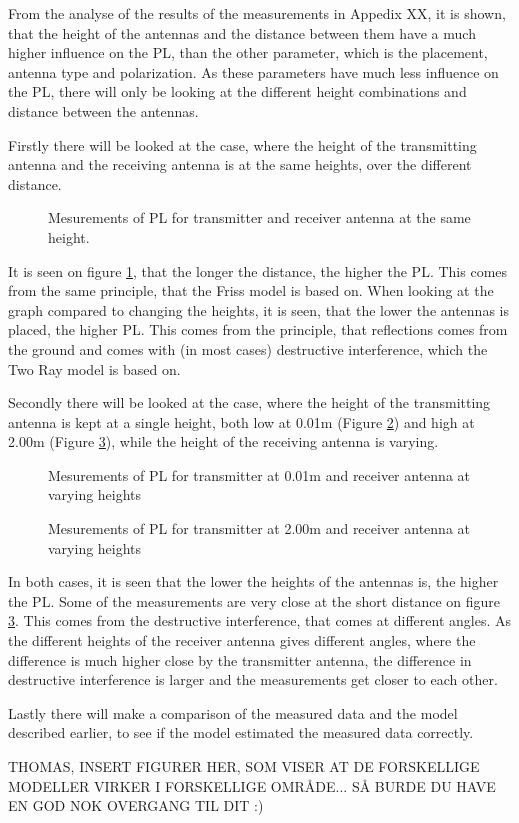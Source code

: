 From the analyse of the results of the measurements in Appedix XX, it is shown, that the height of the antennas and the distance between them have a much higher influence on the PL, than the other parameter, which is the placement, antenna type and polarization. As these parameters have much less influence on the PL, there will only be looking at the different height combinations and distance between the antennas.

Firstly there will be looked at the case, where the height of the transmitting antenna and the receiving antenna is at the same heights, over the different distance.

\begin{figure}[!htbp]
\centering

\caption{Mesurements of PL for transmitter and receiver antenna at the same height.}
\label{Meas1}
\end{figure}

It is seen on figure \ref{Meas1}, that the longer the distance, the higher the PL. This comes from the same principle, that the Friss model is based on. When looking at the graph compared to changing the heights, it is seen, that the lower the antennas is placed, the higher PL. This comes from the principle, that reflections comes from the ground and comes with (in most cases) destructive interference, which the Two Ray model is based on. 

Secondly there will be looked at the case, where the height of the transmitting antenna is kept at a single height, both low at 0.01m (Figure \ref{Meas2}) and high at 2.00m (Figure \ref{Meas3}), while the height of the receiving antenna is varying.

\begin{figure}[!htbp]
\centering

\caption{Mesurements of PL for transmitter at 0.01m and receiver antenna at varying heights}
\label{Meas2}
\end{figure}

\begin{figure}[!htbp]
\centering

\caption{Mesurements of PL for transmitter at 2.00m and receiver antenna at varying heights}
\label{Meas3}
\end{figure}

In both cases, it is seen that the lower the heights of the antennas is, the higher the PL. Some of the measurements are very close at the short distance on figure \ref{Meas3}. This comes from the destructive interference, that comes at different angles. As the different heights of the receiver antenna gives different angles, where the difference is much higher close by the transmitter antenna, the difference in destructive interference is larger and the measurements get closer to each other.

Lastly there will make a comparison of the measured data and the model described earlier, to see if the model estimated the measured data correctly.

THOMAS, INSERT FIGURER HER, SOM VISER AT DE FORSKELLIGE MODELLER VIRKER I FORSKELLIGE OMRÅDE... SÅ BURDE DU HAVE EN GOD NOK OVERGANG TIL DIT :)